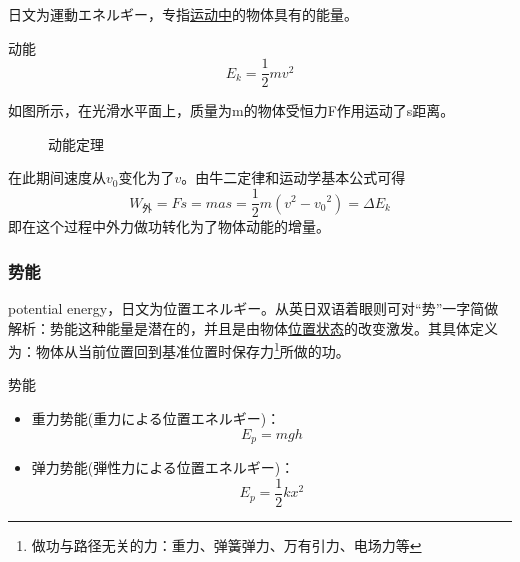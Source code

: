 日文为運動エネルギー，专指\underline{运动中}的物体具有的能量。
\begin{itembox}[l]{动能}
    \begin{equation*}
        E_k=\frac12mv^2
    \end{equation*}
\end{itembox}
如图所示，在光滑水平面上，质量为m的物体受恒力F作用运动了s距离。
\begin{figure}[ht!]
    \centering
    \caption{动能定理}
\end{figure}
在此期间速度从$v_0$变化为了$v$。由牛二定律和运动学基本公式可得
\begin{equation*}
    W_{\textrm{外}}=Fs=mas=\frac12m(v^2-{v_0}^2)=\Delta E_k
\end{equation*}
即在这个过程中外力做功转化为了物体动能的增量。

\subsubsection{势能}

potential energy，日文为位置エネルギー。从英日双语着眼则可对“势”一字简做解析：势能这种能量是潜在的，并且是由物体\underline{位置状态}的改变激发。其具体定义为：物体从当前位置回到基准位置时保存力\footnote{做功与路径无关的力：重力、弹簧弹力、万有引力、电场力等}所做的功。

\begin{itembox}[l]{势能}
    \begin{itemize}
        \item 重力势能(重力による位置エネルギー)：
        \begin{equation*}
            E_p=mgh
        \end{equation*}
        \item 弹力势能(弾性力による位置エネルギー)：
        \begin{equation*}
            E_p=\frac12kx^2
        \end{equation*}    
    \end{itemize}
\end{itembox}

